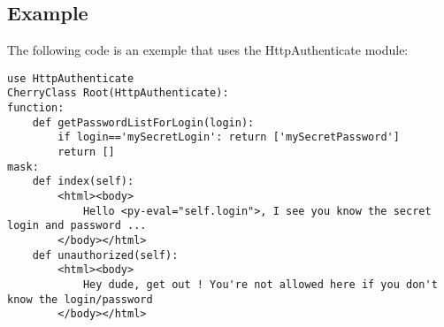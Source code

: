 \subsection{Example}
The following code is an exemple that uses the HttpAuthenticate module:

\begin{verbatim}
use HttpAuthenticate
CherryClass Root(HttpAuthenticate):
function:
    def getPasswordListForLogin(login):
        if login=='mySecretLogin': return ['mySecretPassword']
        return []
mask:
    def index(self):
        <html><body>
            Hello <py-eval="self.login">, I see you know the secret login and password ...
        </body></html>
    def unauthorized(self):
        <html><body>
            Hey dude, get out ! You're not allowed here if you don't know the login/password
        </body></html>
\end{verbatim}


